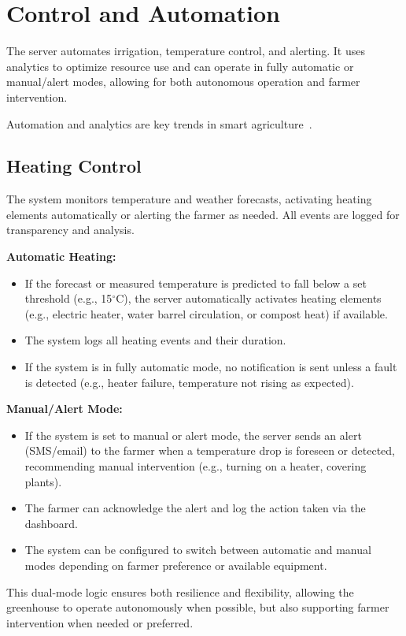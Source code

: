\documentclass[12pt,a4paper]{article}
\begin{document}
\section{Control and Automation}
The server automates irrigation, temperature control, and alerting. It uses analytics to optimize resource use and can operate in fully automatic or manual/alert modes, allowing for both autonomous operation and farmer intervention.

Automation and analytics are key trends in smart agriculture~\cite{SmartAgReview,IoTGreenhouse2022}.

\subsection{Heating Control}
The system monitors temperature and weather forecasts, activating heating elements automatically or alerting the farmer as needed. All events are logged for transparency and analysis.

\textbf{Automatic Heating:}
\begin{itemize}
    \item If the forecast or measured temperature is predicted to fall below a set threshold (e.g., 15$^\circ$C), the server automatically activates heating elements (e.g., electric heater, water barrel circulation, or compost heat) if available.
    \item The system logs all heating events and their duration.
    \item If the system is in fully automatic mode, no notification is sent unless a fault is detected (e.g., heater failure, temperature not rising as expected).
\end{itemize}

\textbf{Manual/Alert Mode:}
\begin{itemize}
    \item If the system is set to manual or alert mode, the server sends an alert (SMS/email) to the farmer when a temperature drop is foreseen or detected, recommending manual intervention (e.g., turning on a heater, covering plants).
    \item The farmer can acknowledge the alert and log the action taken via the dashboard.
    \item The system can be configured to switch between automatic and manual modes depending on farmer preference or available equipment.
\end{itemize}

This dual-mode logic ensures both resilience and flexibility, allowing the greenhouse to operate autonomously when possible, but also supporting farmer intervention when needed or preferred.
\end{document}

